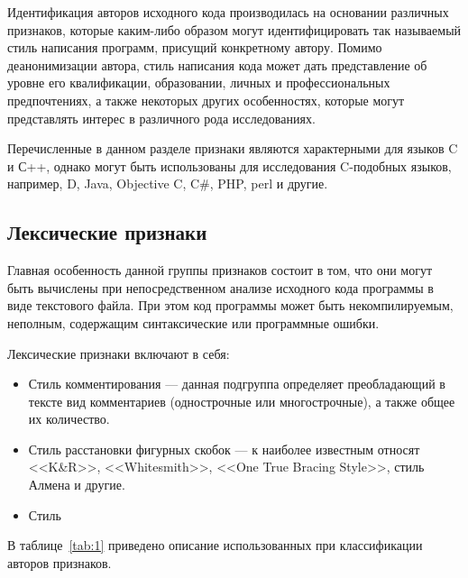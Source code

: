Идентификация авторов исходного кода производилась на основании различных признаков, которые каким-либо 
образом могут идентифицировать так называемый стиль написания программ, присущий конкретному автору. 
Помимо деанонимизации автора, стиль написания кода может дать представление об уровне его квалификации, 
образовании, личных и профессиональных предпочтениях, а также некоторых других особенностях, которые могут 
представлять интерес в различного рода исследованиях. 

Перечисленные в данном разделе признаки являются характерными для языков C и С++, однако могут быть 
использованы для исследования C-подобных языков, например, D, Java, Objective C, C\#, PHP, perl и другие.

\subsection{Лексические признаки}

Главная особенность данной группы признаков состоит в том, что они могут быть вычислены при 
непосредственном анализе исходного кода программы в виде текстового файла. 
При этом код программы может быть некомпилируемым, неполным, содержащим
синтаксические или программные ошибки.

Лексические признаки включают в себя:

\begin{itemize}
 \item Стиль комментирования --- данная подгруппа определяет преобладающий в тексте вид комментариев 
 (однострочные или многострочные), а также общее их количество.
 \item Стиль расстановки фигурных скобок --- к наиболее известным относят <<K\&R>>, <<Whitesmith>>, 
<<One True Bracing Style>>, стиль Алмена и другие.~\cite{bracing_styles} 
 
 \item Стиль 
\end{itemize}



В таблице~\ref{tab:1} приведено описание использованных при классификации авторов 
признаков.

